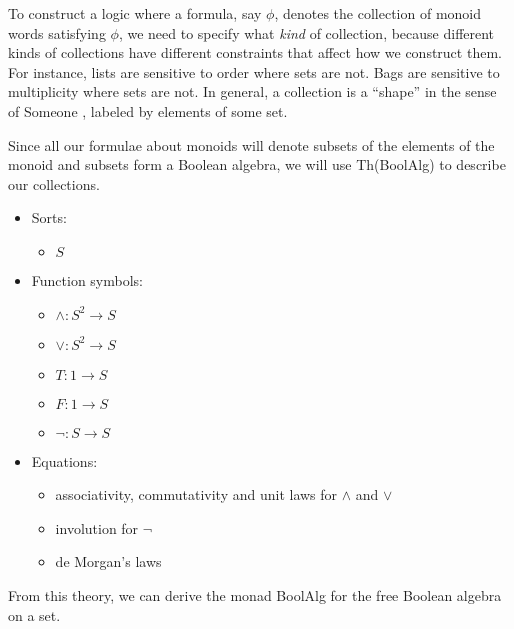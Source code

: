 \documentclass{article}
\newcommand{\maps}{\colon}
\begin{document}
To construct a logic where a formula, say $\phi$, denotes the collection of monoid words satisfying $\phi$, we need to specify what \emph{kind} of collection, because different kinds of collections have different constraints that affect how we construct them. For instance, lists are sensitive to order where sets are not. Bags are sensitive to multiplicity where sets are not.  In general, a collection is a ``shape'' in the sense of Someone \cite{someone}, labeled by elements of some set.

Since all our formulae about monoids will denote subsets of the elements of the monoid and subsets form a Boolean algebra, we will use Th(BoolAlg) to describe our collections.
\begin{center}
  \begin{itemize}
    \item Sorts:
    \begin{itemize}
      \item $S$
    \end{itemize}
    \item Function symbols:
    \begin{itemize}
      \item $\land\maps S^2 \to S$
      \item $\lor\maps S^2 \to S$
      \item $T\maps 1 \to S$
      \item $F\maps 1 \to S$
      \item $\neg\maps S \to S$
    \end{itemize}
    \item Equations:
    \begin{itemize}
      \item associativity, commutativity and unit laws for $\land$ and $\lor$
      \item involution for $\neg$
      \item de Morgan's laws
    \end{itemize}
  \end{itemize}
\end{center}
From this theory, we can derive the monad BoolAlg for the free Boolean algebra on a set.
\end{document}
